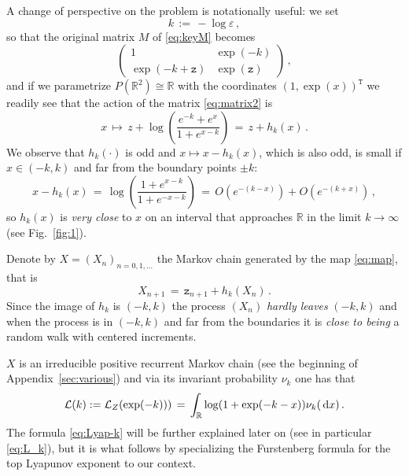 \documentclass[reqno,11pt]{amsart}
\numberwithin{equation}{section}
\newcommand{\cL}{{\ensuremath{\mathcal L}} }
\newcommand{\dd}{\,\text{\rm d}}             %
\newcommand{\bbR}{{\ensuremath{\mathbb R}} }
\newcommand{\gep}{\varepsilon}       %
\newcommand{\gz}{\zeta}
\newcommand{\logZ}{\mathtt{z}}
\begin{document}
 A change of perspective on the problem is notationally useful: we set 
\begin{equation}
k\, :=\, -\log \gep\, ,
\end{equation}
so that 
  the original matrix $M$ of \eqref{eq:keyM}
becomes
 \begin{equation}
\label{eq:matrix2}
\begin{pmatrix}
1& \exp(-k)\\ 
\exp(-k+\logZ)  & \exp(\logZ)
\end{pmatrix}\, ,
\end{equation}
and if we parametrize $P(\bbR^2)\cong \bbR$ with the coordinates $(1, \exp(x))^{\mathtt{T}}$ we readily see that
the action of the matrix \eqref{eq:matrix2} is 
\begin{equation}
\label{eq:map}
x \, \mapsto \, z+ \log \left(
\frac{e^{-k}+e^x}{1+ e^{x-k}}
\right)\, =\, z+ h_k(x)\, .
\end{equation}
We observe that $h_k(\cdot)$ is odd and 
$x \mapsto x- h_k(x)$, which  is also odd,  is small if $x \in (-k,k)$ and far from the boundary points $\pm k$:
\begin{equation}
\label{eq:almost-id}
x-h_k(x)\, =\,  \log \left(\frac{1+ e^{x-k}}
{1+e^{-x-k}}
\right)\, 
=\,  O\left( e^{-(k-x)}\right)+ O\left( e^{-(k+x)}\right)\, ,
\end{equation}
so $h_k(x)$ is \emph{very close} to $x$ on an interval that approaches $\bbR$ in the limit $k \to \infty$ (see Fig.~\ref{fig:1}).

\medskip




Denote by $X=(X_n)_{n=0,1, \ldots}$ the Markov chain generated by 
the map \eqref{eq:map}, that is 
\begin{equation}
\label{eq:XMC}
X_{n+1}\, =\,  \logZ_{n+1} + h_k\left(X_n \right)\, .
\end{equation}
Since the image of $h_k$ is $(-k,k)$ the process $(X_n)$ \emph{hardly leaves} $(-k,k)$ and when the process is in $(-k,k)$ and far from the boundaries it is \emph{close to being} a random walk with centered increments. 



$X$ is  an irreducible positive recurrent Markov chain (see the beginning of Appendix~\ref{sec:various}) and via
its invariant probability $\nu_k$ one has that
\begin{equation}
\label{eq:Lyap-k}
 \cL(k)
 :=
\cL_Z(\exp(-k)))\,=\, \int _\bbR \log(1+ \exp(-k - x)) \nu_k(\dd x) \, .
\end{equation} 
 The formula \eqref{eq:Lyap-k} will be further explained later on (see in particular \eqref{eq:L_k}), but it is what follows by specializing the Furstenberg formula for the top Lyapunov exponent \cite[Th.~3.6]{cf:BL} to our context.
\end{document}
